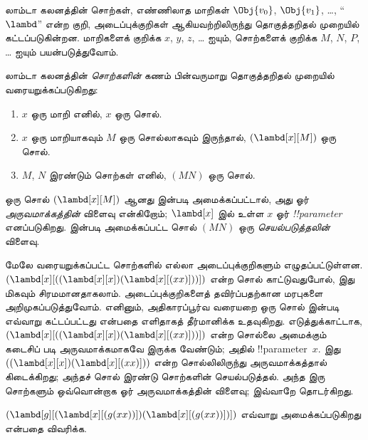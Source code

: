 \documentclass[../../../include/open-logic-section]{subfiles}
\begin{document}

லாம்டா கலனத்தின் சொற்கள், எண்ணிலாத மாறிகள் $\Obj{v_0}$, $\Obj{v_1}$,
\dots, ``$\lambd$'' என்ற குறி, அடைப்புக்குறிகள் ஆகியவற்றிலிருந்து
தொகுத்தறிதல் முறையில் கட்டப்படுகின்றன. மாறிகளைக் குறிக்க $x$, $y$, $z$,
\dots{} ஐயும், சொற்களைக் குறிக்க $M$, $N$, $P$, \dots{} ஐயும் பயன்படுத்துவோம்.

\begin{defn}[சொற்கள்] 
லாம்டா கலனத்தின் \emph{சொற்களின்} கணம் பின்வருமாறு தொகுத்தறிதல் முறையில்
வரையறுக்கப்படுகிறது:
\begin{enumerate}
  \item {} $x$ ஒரு மாறி எனில், $x$ ஒரு சொல்.
  \item {} $x$ ஒரு மாறியாகவும் $M$ ஒரு சொல்லாகவும்
    இருந்தால், $(\lambd[x][M])$ ஒரு சொல்.
  \item {} $M$, $N$ இரண்டும் சொற்கள் எனில்,
    $(MN)$ ஒரு சொல்.
\end{enumerate}
\end{defn}

ஒரு சொல் $(\lambd[x][M])$ ஆனது  இன்படி அமைக்கப்பட்டால்,
அது ஓர் \emph{அருவமாக்கத்தின்} விளைவு என்கிறோம்; $\lambd[x]$ இல் உள்ள
$x$ ஓர் \emph{!!{parameter}} எனப்படுகிறது.  இன்படி
அமைக்கப்பட்ட சொல் $(MN)$ ஒரு \emph{செயல்படுத்தலின்} விளைவு.

மேலே வரையறுக்கப்பட்ட சொற்களில் எல்லா அடைப்புக்குறிகளும் எழுதப்பட்டுள்ளன.
$(\lambd[x][((\lambd[x][x])(\lambd[x][(xx)]))])$ என்ற சொல் காட்டுவதுபோல்,
இது மிகவும் சிரமமானதாகலாம். அடைப்புக்குறிகளைத் தவிர்ப்பதற்கான மரபுகளை
அறிமுகப்படுத்துவோம். எனினும், அதிகாரப்பூர்வ வரையறை ஒரு சொல்
 இன்படி எவ்வாறு கட்டப்பட்டது என்பதை எளிதாகத் தீர்மானிக்க
உதவுகிறது. எடுத்துக்காட்டாக,
$(\lambd[x][((\lambd[x][x])(\lambd[x][(xx)]))])$ என்ற சொல்லை அமைக்கும்
கடைசிப் படி அருவமாக்கமாகவே இருக்க வேண்டும்; அதில் !!{parameter}~$x$.
இது $((\lambd[x][x])(\lambd[x][(xx)]))$ என்ற சொல்லிலிருந்து அருவமாக்கத்தால்
கிடைக்கிறது; அந்தச் சொல் இரண்டு சொற்களின் செயல்படுத்தல். அந்த இரு சொற்களும்
ஒவ்வொன்றாக ஓர் அருவமாக்கத்தின் விளைவு; இவ்வாறே தொடர்கிறது.

\begin{prob}
$(\lambd[g][(\lambd[x][(g (x x))])
  (\lambd[x][(g (x x))])])$ எவ்வாறு அமைக்கப்படுகிறது என்பதை விவரிக்க.
\end{prob}
\end{document}
